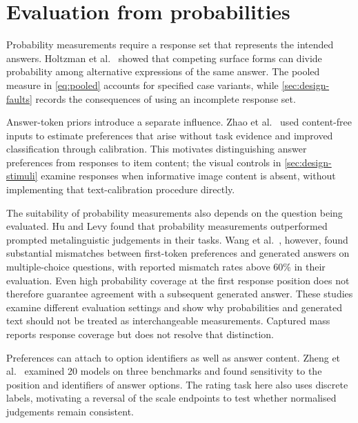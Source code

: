 \section{Evaluation from probabilities}\label{sec:bg-probability}

Probability measurements require a response set that represents the intended
answers. Holtzman et al.\ \cite{holtzman2021surface} showed that competing
surface forms can divide probability among alternative expressions of the
same answer. The pooled measure in \cref{eq:pooled} accounts for specified
case variants, while \cref{sec:design-faults} records the consequences of
using an incomplete response set.

Answer-token priors introduce a separate influence. Zhao et al.\
\cite{zhao2021calibrate} used content-free inputs to estimate preferences
that arise without task evidence and improved classification through
calibration. This motivates distinguishing answer preferences from responses
to item content; the visual controls in \cref{sec:design-stimuli} examine
responses when informative image content is absent, without implementing
that text-calibration procedure directly.

The suitability of probability measurements also depends on the question
being evaluated. Hu and Levy \cite{hu2023prompting} found that probability
measurements outperformed prompted metalinguistic judgements in their tasks.
Wang et al.\ \cite{wang2024myanswer}, however, found substantial mismatches
between first-token preferences and generated answers on multiple-choice
questions, with reported mismatch rates above 60\% in their evaluation.
Even high probability coverage at the first response position does not
therefore guarantee agreement with a subsequent generated answer. These studies examine different evaluation settings and show why
probabilities and generated text should not be treated as interchangeable
measurements. Captured mass reports response coverage but does not resolve
that distinction.

Preferences can attach to option identifiers as well as answer content.
Zheng et al.\ \cite{zheng2024robust} examined 20 models on three benchmarks
and found sensitivity to the position and identifiers of answer options.
The rating task here also uses discrete labels, motivating a reversal of
the scale endpoints to test whether normalised judgements remain consistent.

